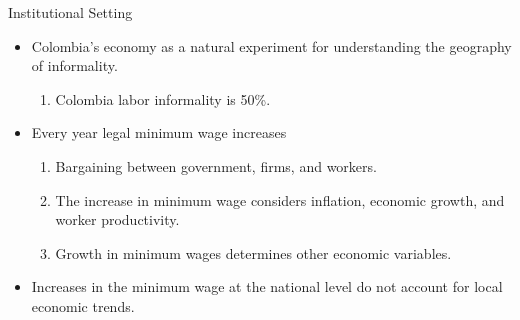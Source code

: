 \documentclass[usenames,dvipsnames,aspectratio=169]{beamer}
\begin{document}
\begin{frame}{Institutional Setting}\label{hw1:institution}
\begin{itemize}
    \item Colombia's economy as a natural experiment for understanding the geography of informality.
    \begin{enumerate}
        \item Colombia labor informality is 50\%. 
    \end{enumerate}
    \item Every year legal minimum wage increases
    \begin{enumerate}
        \item Bargaining between government, firms, and workers. 
        \item The increase in minimum wage considers inflation, economic growth, and worker productivity.
        \item Growth in minimum wages determines other economic variables. 
    \end{enumerate}
    \item Increases in the minimum wage at the national level do not account for local economic trends. 
\end{itemize}
\hyperlink{hw1:motFigs}{}
\end{frame}
\end{document}
